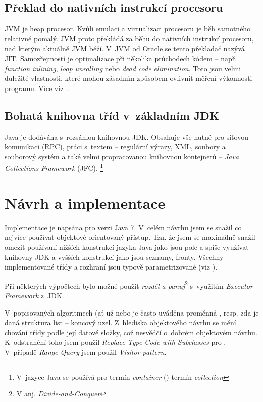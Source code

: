 \subsection{Překlad \bytecode{} do nativních instrukcí procesoru}

JVM je heap procesor.
Kvůli emulaci a virtualizaci procesoru je běh samotného \bytecode{} relativně pomalý.
JVM proto překládá za běhu \bytecode{} do nativních instrukcí procesoru, nad kterým aktuálně JVM běží.
V~JVM od Oracle se tento překladač nazývá JIT\cite{hunt2011java}.
Samozřejmostí je optimalizace při několika průchodech kódem -- např. \emph{function inlining}, \emph{loop unrolling} nebo \emph{dead code elimination}\cite{hunt2011java}.
Toto jsou velmi důležité vlastnosti, které mohou zásadním způsobem ovlivnit měření výkonnosti programu. Více viz~.

\subsection{Bohatá knihovna tříd v~základním JDK}

Java je dodávána s~rozsáhlou knihovnou JDK. Obsahuje vše nutné
pro síťovou komunikaci (RPC), práci s~textem -- regulární výrazy,
XML, soubory a souborový
systém a také velmi propracovanou knihovnou kontejnerů -- \emph{Java
Collections Framework }(JFC). \footnote{V~jazyce Java se používá pro termín \emph{container} (\CC) termín \emph{collection}}

\section{Návrh a implementace}
Implementace  je napsána pro verzi Java 7.
V~celém návrhu jsem se snažil co nejvíce používat objektově orientovaný přístup.
Tzn. že jsem se maximálně snažil omezit používaní nižších konstrukcí jazyka Java jako jsou pole a spíše využívat knihovny JDK a vyšších konstrukcí jako jsou seznamy, fronty.
Všechny implementované třídy a rozhraní jsou typově parametrizované (viz ).

Při některých výpočtech bylo možné použít \emph{rozděl a panuj}\cite{Cormen:2001:IA:580470}\footnote{V anj. \emph{Divide-and-Conquer}} s~využitím \emph{Executor Framework} z~JDK.

V~popisovaných algoritmech (ať už \BPTree{} nebo \MIndex{} je často uváděna proměnná , resp. zda je daná struktura list -- koncový uzel.
Z~hlediska objektového návrhu se mění chování třídy podle její datové složky, což nesvědčí o~dobrém objektovém návrhu.
K~odstranění toho jsem použil \emph{Replace Type Code with Subclasses}\cite{fowler1999refactoring} pro \BPTree{}.
V~případě \MIndex{} \emph{Range Query} jsem použil \emph{Visitor pattern}\cite{gamma1995design}.

